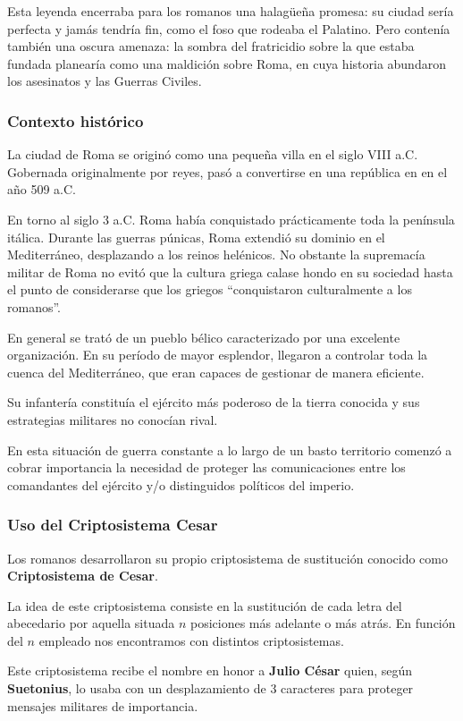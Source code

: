 \documentclass[nochap]{apuntesURJC}
\begin{document}
Esta leyenda encerraba para los romanos una halagüeña promesa: su ciudad sería perfecta y jamás tendría fin, como el foso que rodeaba el Palatino. Pero contenía también una oscura amenaza: la sombra del fratricidio sobre la que estaba fundada planearía como una maldición sobre Roma, en cuya historia abundaron los asesinatos y las Guerras Civiles.

\subsubsection{Contexto histórico}
La ciudad de Roma se originó como una pequeña villa en el siglo VIII a.C. Gobernada originalmente por reyes, pasó a convertirse en una república en en el año 509 a.C.

En torno al siglo 3 a.C. Roma había conquistado prácticamente toda la península itálica. Durante las guerras púnicas, Roma extendió su dominio en el Mediterráneo, desplazando a los reinos helénicos. No obstante la supremacía militar de Roma no evitó que la cultura griega calase hondo en su sociedad hasta el punto de considerarse que los griegos ``conquistaron culturalmente a los romanos''.

En general se trató de un pueblo bélico caracterizado por una excelente organización. En su período de mayor esplendor, llegaron a controlar toda la cuenca del Mediterráneo, que eran capaces de gestionar de manera eficiente.

Su infantería constituía el ejército más poderoso de la tierra conocida y sus estrategias militares no conocían rival.

En esta situación de guerra constante a lo largo de un basto territorio comenzó a cobrar importancia la necesidad de proteger las comunicaciones entre los comandantes del ejército y/o distinguidos políticos del imperio.

\subsubsection{Uso del Criptosistema Cesar}
Los romanos desarrollaron su propio criptosistema de sustitución conocido como \textbf{Criptosistema de Cesar}.

La idea de este criptosistema consiste en la sustitución de cada letra del abecedario por aquella situada $n$ posiciones más adelante o más atrás. En función del $n$ empleado nos encontramos con distintos criptosistemas.

Este criptosistema recibe el nombre en honor a \textbf{Julio César} quien, según \textbf{Suetonius}, lo usaba con un desplazamiento de 3 caracteres para proteger mensajes militares de importancia.
\end{document}
